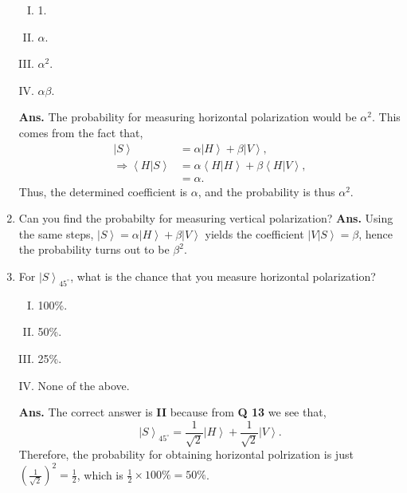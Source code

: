 \documentclass[12pt]{article}
\newcommand\half{\frac{1}{2}}
\newcommand\lr{\left \langle}
\newcommand\rr{\right \rangle}
\newcommand\ls{\left |}
\newcommand\rs{\right |}
\newcommand\tbf[1]{\textbf{#1}}
\begin{document}
\begin{enumerate}[1.]
\begin{enumerate}[I.]
\item 1.
\item $\alpha$.
\item $\alpha^2$.
\item $\alpha \beta$. \newline
\end{enumerate}
\tbf{Ans.} The probability for measuring horizontal polarization would be $\alpha^2$. This comes from the fact that,
$$
\begin{aligned}
 \ls S \rr &= \alpha \ls H \rr + \beta \ls V \rr, \\
\Rightarrow \lr H \rs \left. S \rr &= \alpha \lr H \rs \left. H \rr + \beta \lr H \rs \left. V \rr, \\
&= \alpha.
\end{aligned}
$$
Thus, the determined coefficient is $\alpha$, and the probability is thus $\alpha^2$. \newline
\item Can you find the probabilty for measuring vertical polarization? \newline
\tbf{Ans.} Using the same steps, $\ls S \rr = \alpha \ls H \rr + \beta \ls V \rr$ yields the coefficient $\ls V \rs \left. S \rr = \beta$, hence the probability turns out to be $\beta^2$. \newline
\item For $\ls S \rr _{45^\circ}$, what is the chance that you measure horizontal polarization?
\begin{enumerate}[I.]
	\item 100\%.
	\item 50\%.
	\item 25\%.
	\item None of the above. \newline
\end{enumerate}
\tbf{Ans. }The correct answer is \tbf{II} because from \tbf{Q 13} we see that,
$$
\ls S \rr _{45^\circ} = \frac{1}{\sqrt{2}} \ls H \rr + \frac{1}{\sqrt{2}} \ls V \rr.
$$
Therefore, the probability for obtaining horizontal polrization is just $\left(\frac{1}{\sqrt{2}}\right)^2=\half$, which is $\half \times 100\% = 50\%$. \\ \newline


\end{enumerate}
\end{document}
